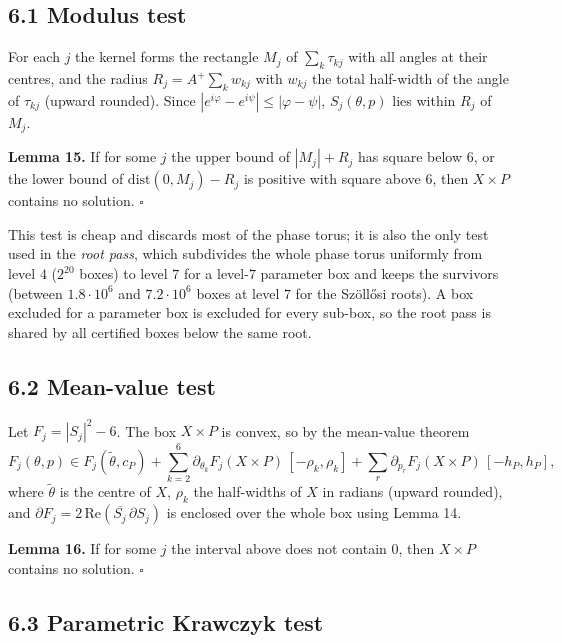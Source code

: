 \documentclass[
  11pt,
]{article}
\begin{document}
\subsection{6.1 Modulus test}\label{modulus-test}

For each \(j\) the kernel forms the rectangle \(M_j\) of
\(\sum_k\tau_{kj}\) with all angles at their centres, and the radius
\(R_j=A^+\sum_kw_{kj}\) with \(w_{kj}\) the total half-width of the
angle of \(\tau_{kj}\) (upward rounded). Since
\(|e^{i\varphi}-e^{i\psi}|\le|\varphi-\psi|\), \(S_j(\theta,p)\) lies
within \(R_j\) of \(M_j\).

\textbf{Lemma 15.} If for some \(j\) the upper bound of \(|M_j|+R_j\)
has square below \(6\), or the lower bound of
\(\mathrm{dist}(0,M_j)-R_j\) is positive with square above \(6\), then
\(X\times P\) contains no solution. \(\square\)

This test is cheap and discards most of the phase torus; it is also the
only test used in the \emph{root pass}, which subdivides the whole phase
torus uniformly from level \(4\) (\(2^{20}\) boxes) to level \(7\) for a
level-\(7\) parameter box and keeps the survivors (between
\(1.8\cdot10^6\) and \(7.2\cdot10^6\) boxes at level \(7\) for the
Szöllősi roots). A box excluded for a parameter box is excluded for
every sub-box, so the root pass is shared by all certified boxes below
the same root.

\subsection{6.2 Mean-value test}\label{mean-value-test}

Let \(F_j=|S_j|^2-6\). The box \(X\times P\) is convex, so by the
mean-value theorem \[
F_j(\theta,p)\in F_j(\tilde\theta,c_P)+\sum_{k=2}^6\partial_{\theta_k}F_j(X\times P)\,[-\rho_k,\rho_k]+\sum_{r}\partial_{p_r}F_j(X\times P)\,[-h_P,h_P],
\] where \(\tilde\theta\) is the centre of \(X\), \(\rho_k\) the
half-widths of \(X\) in radians (upward rounded), and
\(\partial F_j=2\,\mathrm{Re}(\overline{S_j}\,\partial S_j)\) is
enclosed over the whole box using Lemma 14.

\textbf{Lemma 16.} If for some \(j\) the interval above does not contain
\(0\), then \(X\times P\) contains no solution. \(\square\)

\subsection{6.3 Parametric Krawczyk
test}\label{parametric-krawczyk-test}
\end{document}
